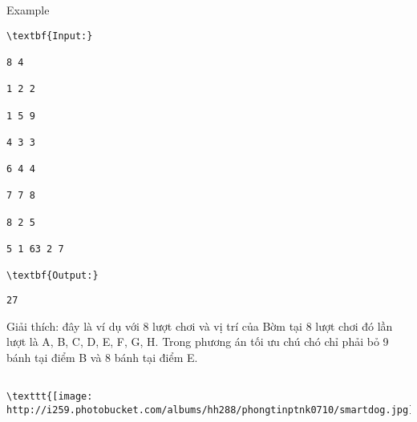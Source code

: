 Example
\begin{verbatim}
\textbf{Input:}

8 4

1 2 2

1 5 9

4 3 3

6 4 4

7 7 8

8 2 5

5 1 63 2 7

\textbf{Output:}\end{verbatim}
\begin{verbatim}
27\end{verbatim}

Giải thích: đây là ví dụ với 8 lượt chơi và vị trí của Bờm tại 8 lượt chơi đó lần lượt là A, B, C, D, E, F, G, H. Trong phương án tối ưu chú chó chỉ phải bỏ 9 bánh tại điểm B và 8 bánh tại điểm E.
\begin{verbatim}

\texttt{[image: http://i259.photobucket.com/albums/hh288/phongtinptnk0710/smartdog.jpg]}\end{verbatim}